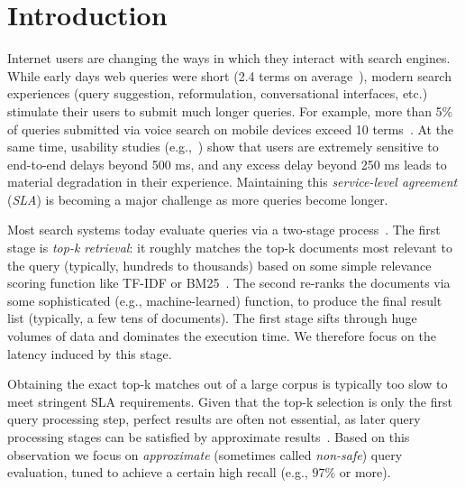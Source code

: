 \section{Introduction}
\label{sec:intro}

Internet users are changing the ways in which they interact with search engines. 
While  early days web queries were short (2.4 terms on average~\cite{Spink:2001:SWP:362968.362979}), 
modern search experiences (query suggestion, reformulation, conversational interfaces, etc.) stimulate their users to submit much longer queries. 
For example, more than 5\% of queries submitted via voice search on mobile devices exceed 10 terms~\cite{sigir/Guy16}. 
At the same time, usability studies
(e.g.,~\cite{Arapakis:2014:IRL:2600428.2609627}) show that users are extremely sensitive to end-to-end delays beyond 500 ms, 
and any excess delay beyond 250 ms leads to material degradation in their experience. Maintaining this \emph{service-level agreement} ({\em SLA}) 
is becoming a major challenge as more queries become longer.

 Most search systems today evaluate queries via a two-stage process~\cite{Wang:2011}. 
The first stage is \emph{top-k retrieval}: it 
 roughly matches the top-k documents most relevant to the query (typically, hundreds to thousands) based on some simple relevance scoring function like TF-IDF or BM25~\cite{Baeza-Yates:1999:MIR:553876}. The second  re-ranks the  documents via some sophisticated (e.g., machine-learned) function, to produce the final result list (typically, a few tens of documents). 
The first stage  sifts through huge volumes of data and dominates the execution time. 
We therefore focus on the latency induced by this stage. 



Obtaining the exact top-k matches out of a large corpus is typically too slow to meet stringent SLA requirements. 
Given that the top-k selection is only the first query  processing step, perfect results are often not essential, as later query processing 
stages can be satisfied by approximate results~\cite{Lin:2015}. Based on this observation we focus on \emph{approximate} 
(sometimes called \emph{non-safe}) query evaluation, tuned to achieve a certain high recall (e.g., $97\%$ or more). 

